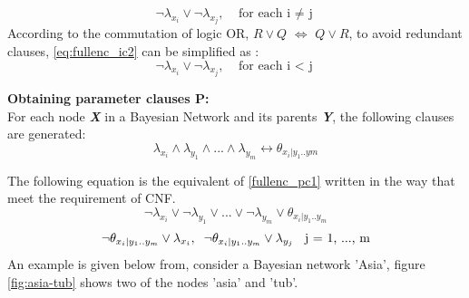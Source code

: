             \begin{equation}\label{eq:fullenc_ic2}
                \neg\lambda_{x_{i}} \vee \neg\lambda_{x_{j}}, \;\;\; \mbox{for each i $\neq$ j}
            \end{equation}
            According to the commutation of logic OR, $R \vee Q$ $\Longleftrightarrow$ $Q \vee R$, to avoid redundant clauses, \ref{eq:fullenc_ic2} can be simplified as :
            \begin{equation}\label{fullenc_ic3}
                \neg\lambda_{x_{i}} \vee \neg\lambda_{x_{j}}, \;\;\; \mbox{for each i $<$ j}
            \end{equation}
            
            \noindent \textbf{Obtaining parameter clauses \textsc{P}:}\\
            For each node \textbf{\textit{X}} in a Bayesian Network and its parents \textbf{\textit{Y}}, the following clauses are generated:
            \begin{equation}\label{fullenc_pc1}
                \lambda_{x_{i}} \wedge \lambda_{y_{1}} \wedge... \wedge \lambda_{y_{m}} \leftrightarrow \theta_{x_{i}|y_{1}..y{m}}
            \end{equation}
            
            The following equation is the equivalent of \ref{fullenc_pc1} written in the way that meet the requirement of CNF.
            \begin{equation}\label{fullenc_IP}
                \neg\lambda_{x_{i}} \vee \neg\lambda_{y_{1}} \vee... \vee \neg\lambda_{y_{m}} \vee \theta_{x_{i}|y_{1}..y_{m}}
            \end{equation}
            \begin{equation}\label{fullenc_PI}
                \neg\theta_{x_{i}|y_{1}..y_{m}} \vee \lambda_{x_{i}},\\ \;\;
                \neg\theta_{x_{i}|y_{1}..y_{m}} \vee \lambda_{y_{j}} \;\; \mbox{ j = 1, ..., m}
            \end{equation}
            An example is given below from, consider a Bayesian network 'Asia', figure \ref{fig:asia-tub} shows two of the nodes 'asia' and 'tub'.
            
